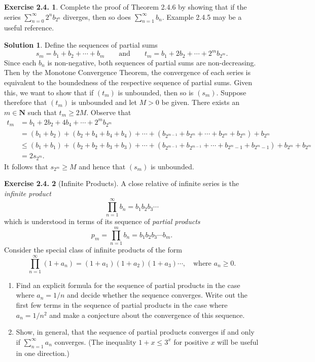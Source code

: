 \documentclass[12pt]{article}
\theoremstyle{definition}
\theoremstyle{exercise}
\newtheorem{exercise}{Exercise 2.4.}
\theoremstyle{solution}
\newtheorem*{solution}{Solution}
\newcommand{\N}{\mathbf{N}}
\begin{document}
\begin{exercise}
\label{ex:9}
    Complete the proof of Theorem 2.4.6 by showing that if the series \( \sum_{n=0}^{\infty} 2^n b_{2^n} \) diverges, then so does \( \sum_{n=1}^{\infty} b_n \). Example 2.4.5 may be a useful reference.
\end{exercise}

\begin{solution}
    Define the sequences of partial sums
    \[
        s_m = b_1 + b_2 + \cdots + b_m \qquad \text{and} \qquad t_m = b_1 + 2 b_2 + \cdots + 2^m b_{2^m}.
    \]
    Since each \( b_n \) is non-negative, both sequences of partial sums are non-decreasing. Then by the Monotone Convergence Theorem, the convergence of each series is equivalent to the boundedness of the respective sequence of partial sums. Given this, we want to show that if \( (t_m) \) is unbounded, then so is \( (s_m) \). Suppose therefore that \( (t_m) \) is unbounded and let \( M > 0 \) be given. There exists an \( m \in \N \) such that \( t_m \geq 2M \). Observe that
    \begin{align*}
        t_m &= b_1 + 2 b_2 + 4 b_4 + \cdots + 2^m b_{2^m} \\
        &= (b_1 + b_2) + (b_2 + b_4 + b_4 + b_4) + \cdots + (b_{2^{m-1}} + b_{2^m} + \cdots + b_{2^m} + b_{2^m}) + b_{2^m} \\
        &\leq (b_1 + b_1) + (b_2 + b_2 + b_3 + b_3) + \cdots + (b_{2^{m-1}} + b_{2^{m-1}} + \cdots + b_{2^m - 1} + b_{2^m - 1}) + b_{2^m} + b_{2^m} \\
        &= 2 s_{2^m}.
    \end{align*}
    It follows that \( s_{2^m} \geq M \) and hence that \( (s_m) \) is unbounded.
\end{solution}

\begin{exercise}[Infinite Products]
\label{ex:10}
    A close relative of infinite series is the \textit{infinite product}
    \[
        \prod_{n=1}^{\infty} b_n = b_1 b_2 b_3 \cdots
    \]
    which is understood in terms of its sequence of \textit{partial products}
    \[
        p_m = \prod_{n=1}^m b_n = b_1 b_2 b_3 \cdots b_m.
    \]
    Consider the special class of infinite products of the form
    \[
        \prod_{n=1}^{\infty} (1 + a_n) = (1 + a_1)(1 + a_2)(1 + a_3) \cdots, \quad \text{where } a_n \geq 0.
    \]
    \begin{enumerate}
        \item Find an explicit formula for the sequence of partial products in the case where \( a_n = 1/n \) and decide whether the sequence converges. Write out the first few terms in the sequence of partial products in the case where \( a_n = 1/n^2 \) and make a conjecture about the convergence of this sequence.

        \item Show, in general, that the sequence of partial products converges if and only if \( \sum_{n=1}^{\infty} a_n \) converges. (The inequality \( 1 + x \leq 3^x \) for positive \( x \) will be useful in one direction.)
    \end{enumerate}
\end{exercise}
\end{document}
